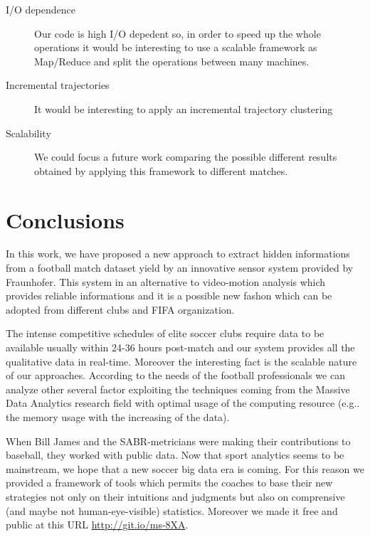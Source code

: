 \documentclass{acm_proc_article-sp-sigmod07}
\begin{document}
\begin{description}
  \item[I/O dependence] Our code is high I/O depedent so, in order to speed up the whole operations it would be interesting to use a scalable framework as Map/Reduce and split the operations between many machines.
  \item[Incremental trajectories] It would be interesting to apply an incremental trajectory clustering \cite{li2010incremental}
  \item[Scalability] We could focus a future work comparing the possible different results obtained by applying this framework to different matches.
\end{description}

\section{Conclusions}
In this work, we have proposed a new approach to extract hidden informations from a football match dataset yield by an innovative sensor system provided by Fraunhofer. This system in an alternative to video-motion analysis which provides reliable informations and it is a possible new fashon which can be adopted from different clubs and FIFA organization. 

The intense competitive schedules of elite soccer clubs require data to be available usually within 24-36 hours post-match \cite{Figueroa2006122} and our system provides all the qualitative data in real-time. Moreover the interesting fact is the scalable nature of our approaches. According to the needs of the football professionals we can analyze other several factor exploiting the techniques coming from the Massive Data Analytics research field with optimal usage of the computing resource (e.g.. the memory usage with the increasing of the data). 

When Bill James and the SABR-metricians were making their contributions to baseball, they worked with public data. Now that sport analytics seems to be mainstream, we hope that a new soccer big data era is coming. For this reason we provided a framework of tools which permits the coaches to base their new strategies not only on their intuitions and judgments but also on comprensive (and maybe not human-eye-visible) statistics. Moreover we made it free and public at this URL \url{http://git.io/ms-8XA}.



%

%
%
\balancecolumns



\end{document}
